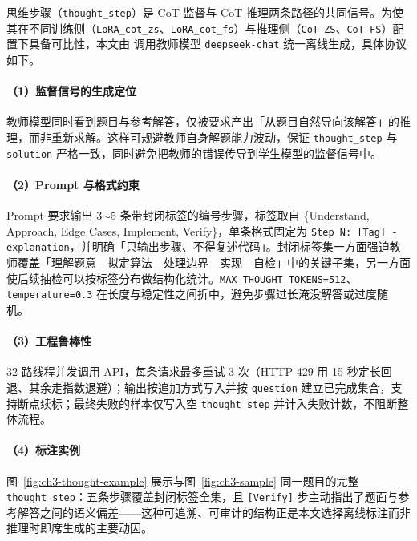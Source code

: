 
思维步骤（\texttt{thought\_step}）是 CoT 监督与 CoT 推理两条路径的共同信号。为使其在不同训练侧（\texttt{LoRA\_cot\_zs}、\texttt{LoRA\_cot\_fs}）与推理侧（\texttt{CoT-ZS}、\texttt{CoT-FS}）配置下具备可比性，本文由  调用教师模型 \texttt{deepseek-chat} 统一离线生成，具体协议如下。

\paragraph{（1）监督信号的生成定位}
教师模型同时看到题目与参考解答，仅被要求产出「从题目自然导向该解答」的推理，而非重新求解。这样可规避教师自身解题能力波动，保证 \texttt{thought\_step} 与 \texttt{solution} 严格一致，同时避免把教师的错误传导到学生模型的监督信号中。

\paragraph{（2）Prompt 与格式约束}
Prompt 要求输出 3$\sim$5 条带封闭标签的编号步骤，标签取自 \{Understand, Approach, Edge Cases, Implement, Verify\}，单条格式固定为 \texttt{Step N: [Tag] - explanation}，并明确「只输出步骤、不得复述代码」。封闭标签集一方面强迫教师覆盖「理解题意—拟定算法—处理边界—实现—自检」中的关键子集，另一方面使后续抽检可以按标签分布做结构化统计。\texttt{MAX\_THOUGHT\_TOKENS=512}、\texttt{temperature=0.3} 在长度与稳定性之间折中，避免步骤过长淹没解答或过度随机。

\paragraph{（3）工程鲁棒性}
32 路线程并发调用 API，每条请求最多重试 3 次（HTTP 429 用 15 秒定长回退、其余走指数退避）；输出按追加方式写入并按 \texttt{question} 建立已完成集合，支持断点续标；最终失败的样本仅写入空 \texttt{thought\_step} 并计入失败计数，不阻断整体流程。

\paragraph{（4）标注实例}
图~\ref{fig:ch3-thought-example} 展示与图~\ref{fig:ch3-sample} 同一题目的完整 \texttt{thought\_step}：五条步骤覆盖封闭标签全集，且 \texttt{[Verify]} 步主动指出了题面与参考解答之间的语义偏差——这种可追溯、可审计的结构正是本文选择离线标注而非推理时即席生成的主要动因。

